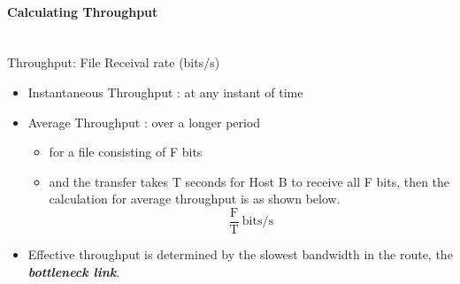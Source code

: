 \documentclass[a4paper]{article}
\begin{document}
\paragraph{Calculating Throughput}\mbox{}\\
Throughput: File Receival rate (bits/s)
\begin{itemize}
	\item Instantaneous Throughput : at any instant of time
	\item Average Throughput : over a longer period
	\begin{itemize}[label=$\circ$]
		\item for a file consisting of F bits
		\item and the transfer takes T seconds for Host B to receive all F bits, then the calculation for average throughput is as shown below. $$ \frac{\text{F}}{\text{T}} \ \text{bits/s}$$
	\end{itemize}
	\item Effective throughput is determined by the slowest bandwidth in the route, the \textbf{\textit{bottleneck link}}.
\end{itemize}
\end{document}
